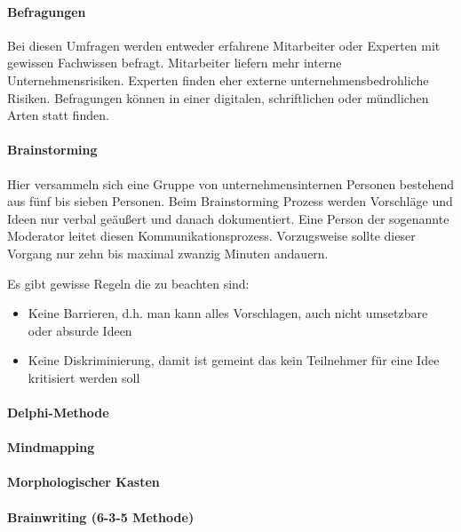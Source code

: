 \paragraph{Befragungen}
Bei diesen Umfragen werden entweder erfahrene Mitarbeiter oder Experten mit gewissen Fachwissen befragt. Mitarbeiter liefern mehr interne Unternehmensrisiken. Experten finden eher externe unternehmensbedrohliche Risiken. Befragungen können in einer digitalen, schriftlichen oder mündlichen Arten statt finden.

\paragraph{Brainstorming}
Hier versammeln sich eine Gruppe von unternehmensinternen Personen bestehend aus fünf bis sieben Personen. Beim Brainstorming Prozess werden Vorschläge und Ideen nur verbal geäußert und  danach dokumentiert. Eine Person der sogenannte Moderator leitet diesen Kommunikationsprozess. Vorzugsweise sollte dieser Vorgang nur zehn bis maximal zwanzig Minuten andauern.

Es gibt gewisse Regeln die zu beachten sind:
\begin{itemize}
	\item Keine Barrieren, d.h. man kann alles Vorschlagen, auch nicht umsetzbare oder absurde Ideen
	\item Keine Diskriminierung, damit ist gemeint das kein Teilnehmer für eine Idee kritisiert werden soll
\end{itemize}


\paragraph{Delphi-Methode}


\paragraph{Mindmapping}

\paragraph{Morphologischer Kasten}

\paragraph{Brainwriting (6-3-5 Methode)}



